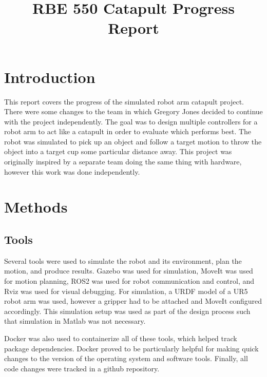 \documentclass[conference]{IEEEtran}
\begin{document}
\title{RBE 550 Catapult Progress Report}

\author{
}

\maketitle

\section{Introduction}
This report covers the progress of the simulated robot arm catapult
project. There were some changes to the team in which Gregory Jones decided to
continue with the project independently. The goal was to design multiple
controllers for a robot arm to act like a catapult in order to evaluate which
performs best. The robot was simulated to pick up an object and follow a target
motion to throw the object into a target cup some particular distance away. This
project was originally inspired by a separate team doing the same thing with
hardware, however this work was done independently.

\section{Methods}

\subsection{Tools}
Several tools were used to simulate the robot and its environment, plan the
motion, and produce results. Gazebo was used for simulation, MoveIt was used for
motion planning, ROS2 was used for robot communication and control, and Rviz was
used for visual debugging. For simulation, a URDF model of a UR5 robot arm was
used, however a gripper had to be attached and MoveIt configured
accordingly. This simulation setup was used as part of the design process such
that simulation in Matlab was not necessary.

Docker was also used to containerize all of these tools, which helped track
package dependencies. Docker proved to be particularly helpful for making quick
changes to the version of the operating system and software tools. Finally, all
code changes were tracked in a github repository.
\end{document}
